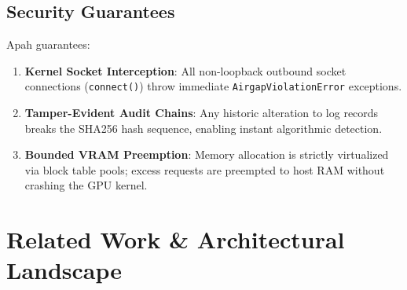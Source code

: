 \documentclass[10pt,twocolumn,a4paper]{article}
\theoremstyle{definition}
\theoremstyle{remark}
\begin{document}
\subsection{Security Guarantees}
Apah guarantees:
\begin{enumerate}
    \item \textbf{Kernel Socket Interception}: All non-loopback outbound socket connections (\texttt{connect()}) throw immediate \texttt{AirgapViolationError} exceptions.
    \item \textbf{Tamper-Evident Audit Chains}: Any historic alteration to log records breaks the SHA256 hash sequence, enabling instant algorithmic detection.
    \item \textbf{Bounded VRAM Preemption}: Memory allocation is strictly virtualized via block table pools; excess requests are preempted to host RAM without crashing the GPU kernel.
\end{enumerate}

\section{Related Work \& Architectural Landscape}
\label{sec:related_work}

\begin{table}[h]
\centering
\renewcommand{\arraystretch}{1.3} %
\caption{Architectural Comparison Across Inference Runtimes.}
\label{tab:related_work}
\end{table}
\end{document}
